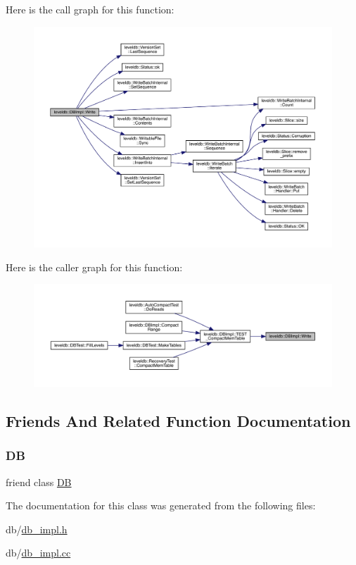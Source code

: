 Here is the call graph for this function\+:
\nopagebreak
\begin{figure}[H]
\begin{center}
\leavevmode
\includegraphics[width=350pt]{classleveldb_1_1_d_b_impl_ac0d0b472717099d6a02ad9dace4e8ef4_cgraph}
\end{center}
\end{figure}
Here is the caller graph for this function\+:
\nopagebreak
\begin{figure}[H]
\begin{center}
\leavevmode
\includegraphics[width=350pt]{classleveldb_1_1_d_b_impl_ac0d0b472717099d6a02ad9dace4e8ef4_icgraph}
\end{center}
\end{figure}


\subsection{Friends And Related Function Documentation}
\mbox{\label{classleveldb_1_1_d_b_impl_ad22eb7a23cbf34de526efa966c578d4a}} 
\subsubsection{\texorpdfstring{DB}{DB}}
{\footnotesize\ttfamily friend class \mbox{\hyperlink{classleveldb_1_1_d_b}{DB}}\hspace{0.3cm}{\ttfamily [friend]}}



The documentation for this class was generated from the following files\+:\begin{DoxyCompactItemize}
\item 
db/\mbox{\hyperlink{db__impl_8h}{db\+\_\+impl.\+h}}\item 
db/\mbox{\hyperlink{db__impl_8cc}{db\+\_\+impl.\+cc}}\end{DoxyCompactItemize}
